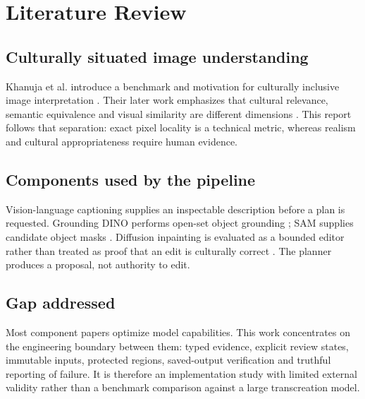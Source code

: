 \chapter{Literature Review}
\label{ch:literature}
\section{Culturally situated image understanding}
Khanuja et al. introduce a benchmark and motivation for culturally inclusive image interpretation \cite{khanuja2024image}. Their later work emphasizes that cultural relevance, semantic equivalence and visual similarity are different dimensions \cite{khanuja2025evaluating}. This report follows that separation: exact pixel locality is a technical metric, whereas realism and cultural appropriateness require human evidence.

\section{Components used by the pipeline}
Vision-language captioning supplies an inspectable description before a plan is requested. Grounding DINO performs open-set object grounding \cite{liu2023groundingdino}; SAM supplies candidate object masks \cite{kirillov2023sam}. Diffusion inpainting is evaluated as a bounded editor rather than treated as proof that an edit is culturally correct \cite{rombach2022ldm,podell2023sdxl}. The planner produces a proposal, not authority to edit.

\section{Gap addressed}
Most component papers optimize model capabilities. This work concentrates on the engineering boundary between them: typed evidence, explicit review states, immutable inputs, protected regions, saved-output verification and truthful reporting of failure. It is therefore an implementation study with limited external validity rather than a benchmark comparison against a large transcreation model.
